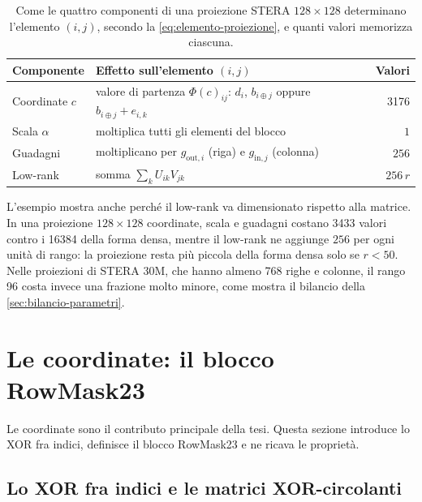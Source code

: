 \begin{table}[H]
\centering
\small
\renewcommand{\arraystretch}{1.25}
\begin{tabular}{>{\raggedright\arraybackslash}p{24mm}>{\raggedright\arraybackslash}p{62mm}r}
\toprule
Componente & Effetto sull'elemento $(i,j)$ & Valori \\
\midrule
\rowcolor{steraBlu!12} Coordinate $c$ & valore di partenza $\Phi(c)_{ij}$: $d_i$, $b_{i\oplus j}$ oppure $b_{i\oplus j}+e_{i,k}$ & \num{3176} \\
\rowcolor{steraGrigio!12} Scala $\alpha$ & moltiplica tutti gli elementi del blocco & $1$ \\
\rowcolor{steraVerde!15} Guadagni & moltiplicano per $g_{\mathrm{out},i}$ (riga) e $g_{\mathrm{in},j}$ (colonna) & $256$ \\
\rowcolor{steraArancio!15} Low-rank & somma $\sum_{k} U_{ik}V_{jk}$ & $256\,r$ \\
\bottomrule
\end{tabular}
\caption{Come le quattro componenti di una proiezione STERA $128\times128$ determinano l'elemento $(i,j)$, secondo la \eqref{eq:elemento-proiezione}, e quanti valori memorizza ciascuna.}
\label{tab:proiezione-128}
\end{table}

L'esempio mostra anche perché il low-rank va dimensionato rispetto alla matrice. In una proiezione $128\times128$ coordinate, scala e guadagni costano \num{3433} valori contro i \num{16384} della forma densa, mentre il low-rank ne aggiunge $256$ per ogni unità di rango: la proiezione resta più piccola della forma densa solo se $r<50$. Nelle proiezioni di STERA 30M, che hanno almeno 768 righe e colonne, il rango 96 costa invece una frazione molto minore, come mostra il bilancio della \autoref{sec:bilancio-parametri}.


\section{Le coordinate: il blocco RowMask23}
\label{sec:coordinate}

Le coordinate sono il contributo principale della tesi. Questa sezione introduce lo XOR fra indici, definisce il blocco RowMask23 e ne ricava le proprietà.

\subsection{Lo XOR fra indici e le matrici XOR-circolanti}
\label{sec:notazione}

